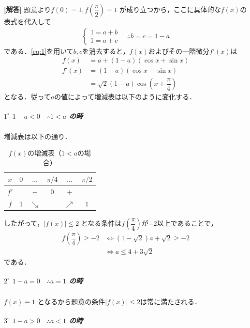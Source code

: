 \documentclass[../../main.tex]{subfiles}
\begin{document}
\begin{oframed}
  
\end{oframed}

{\bf [解答]}
題意より$f(0) = 1, f\left(\dfrac{\pi}{2}\right) = 1$ が成り立つから，ここに具体的な$f(x)$の表式を代入して
\begin{align}
  \begin{cases}
    1 = a + b \\
    1 = a + c
  \end{cases}
  \quad \therefore b = c = 1 - a \label{eq:1}
\end{align}
である．\cref{eq:1}を用いて$b,c$を消去すると，$f(x)$およびその一階微分$f'(x)$は
\begin{align}
  f(x) &= a + (1-a)(\cos x + \sin x) \\
  f'(x) &= (1-a)(\cos x - \sin x) \\
  &= \sqrt{2}(1-a)\cos\left(x + \dfrac{\pi}{4}\right) \label{eq:2}
\end{align}
となる．従って$a$の値によって増減表は以下のように変化する．

\subparagraph{$1^\circ$ $1-a < 0 \quad \therefore 1 < a$ の時}

増減表は以下の通り．

\begin{table}[htb]
  \begin{center}
    \caption{$f(x)$の増減表（$1<a$の場合）}
    \begin{tabular}{c|ccccc}
      $x$ & $0$ & $\dots$ & $\pi/4$ & $\dots$ & $\pi/2$ \\ \hline
      $f'$ & & $-$ & $0$ & $+$ & \\ \hline
      $f$ & $1$ & $\searrow$ & & $\nearrow$ & $1$
    \end{tabular}
  \end{center}
\end{table}

したがって，$|f(x)| \le 2$ となる条件は$f\left(\dfrac{\pi}{4}\right)$が$-2$以上であることで，
\begin{align}
  f\left(\dfrac{\pi}{4}\right) \ge -2
  & \iff (1-\sqrt{2})a+\sqrt{2} \ge -2 \\
  & \iff a \le 4+3\sqrt{2}
\end{align}
である．

\subparagraph{$2^\circ$ $1-a = 0 \quad \therefore a = 1$ の時}
$f(x) \equiv 1$ となるから題意の条件$|f(x)| \le 2$は常に満たされる．

\subparagraph{$3^\circ$ $1-a > 0 \quad \therefore a < 1$ の時}
\end{document}

